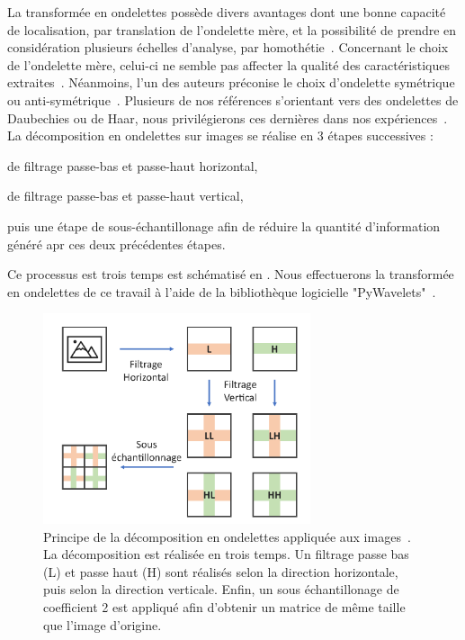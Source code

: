 La transformée en ondelettes possède divers avantages dont une bonne capacité de localisation, par translation de l'ondelette mère, et la possibilité de prendre en considération plusieurs échelles d'analyse, par homothétie~\cite{Livens1997,Wiltgen2008}. Concernant le choix de l'ondelette mère, celui-ci ne semble pas affecter la qualité des caractéristiques extraites~\cite{Fatemi1996, Livens1997}. Néanmoins, l'un des auteurs préconise le choix d'ondelette symétrique ou anti-symétrique~\cite{Livens1997}. Plusieurs de nos références s'orientant vers des ondelettes de Daubechies ou de Haar, nous privilégierons ces dernières dans nos expériences~\cite{Wiltgen2008,Halimi2017a}. La décomposition en ondelettes sur images se réalise en 3 étapes successives : 
\begin{inlinerate}
    \item de filtrage passe-bas et passe-haut horizontal,
    \item de filtrage passe-bas et passe-haut vertical,
    \item puis une étape de sous-échantillonage afin de réduire la quantité d'information généré apr ces deux précédentes étapes.
\end{inlinerate} Ce processus est trois temps est schématisé en . Nous effectuerons la transformée en ondelettes de ce travail à l'aide de la bibliothèque logicielle "PyWavelets"~\cite{lee2006}.\par

\begin{figure}[H]
    \centering
    \includegraphics[width=0.7\textwidth]{contents/chapter_4/resources/scheme_dwt.pdf}
    \caption{Principe de la décomposition en ondelettes appliquée aux images~\cite{Livens1997}. La décomposition est réalisée en trois temps. Un filtrage passe bas (L) et passe haut (H) sont réalisés selon la direction horizontale, puis selon la direction verticale. Enfin, un sous échantillonage de coefficient 2 est appliqué afin d'obtenir un matrice de même taille que l'image d'origine.}
    \label{fig:scheme_dwt}
\end{figure}\par 

